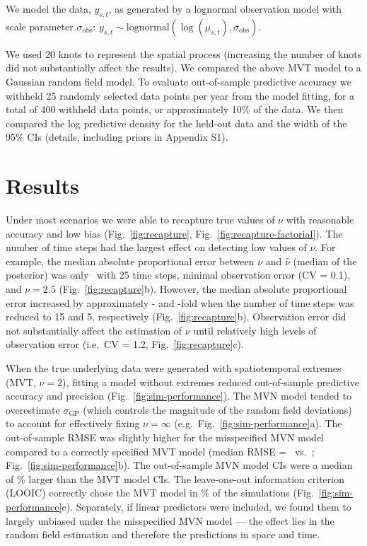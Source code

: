 \documentclass[12pt,english]{article}
\newcommand{\R}[1]{\label{#1}\linelabel{#1}}
\begin{document}
\begin{spacing}{1.8}
\noindent We model the data, $y_{s,t}$, as generated by a lognormal
observation model with scale parameter $\sigma_{\mathrm{obs}}$: $y_{s,t} \sim
\mathrm{lognormal} \left(  \log(\mu_{s,t}), \sigma_{\mathrm{obs}} \right)$.

We used 20 knots to represent the spatial process
(increasing the number of knots did not substantially affect the results). We
compared the above MVT model to a Gaussian random field model. To evaluate
out-of-sample predictive accuracy we withheld 25 randomly selected data points
per year from the model fitting, for a total of 400 withheld data points, or
approximately 10\% of the data. We then compared the log predictive density for
the held-out data and the width of the 95\% CIs
(details, including priors in Appendix S1).

\section{Results}

Under most scenarios we were able to recapture true values of $\nu$ with
reasonable accuracy and low bias (Fig.~\ref{fig:recapture},
Fig.~\ref{fig:recapture-factorial}). The number of time steps had the largest
effect on detecting low values of $\nu$. For example, the median absolute
proportional error between $\nu$ and $\hat{\nu}$ (median of the posterior) was
only \mapeTwentyFive\ with 25 time steps, minimal observation error (CV = 0.1),
and $\nu = 2.5$ (Fig.~\ref{fig:recapture}b). However, the median absolute
proportional error increased by approximately \mapeFifteenIncFold - and
\mapeFiveIncFold -fold when the number of time steps was reduced to 15 and 5,
respectively (Fig.~\ref{fig:recapture}b). Observation error did not
substantially affect the estimation of $\nu$ until relatively high levels of
observation error (i.e.\ CV = 1.2, Fig.~\ref{fig:recapture}c).

When the true underlying data were generated with spatiotemporal extremes (MVT,
$\nu = 2$), fitting a model without extremes reduced out-of-sample predictive
accuracy and precision (Fig.~\ref{fig:sim-performance}). The MVN model tended to
overestimate $\sigma_{\mathrm{GP}}$ (which controls the magnitude of the random field
deviations) to account for effectively fixing $\nu = \infty$ (e.g.\
Fig.~\ref{fig:sim-performance}a).
The out-of-sample RMSE was slightly higher for the
misspecified MVN model compared to a correctly specified MVT model (median RMSE
= \rmseWrong\ vs.\ \rmseRight; Fig.~\ref{fig:sim-performance}b). The out-of-sample MVN
model CIs were a median of \medianMedianCIWiderSim \% larger than the MVT model
CIs. The leave-one-out information criterion (LOOIC) correctly chose the MVT
model in \looCorrectSim \% of the simulations (Fig.~\ref{fig:sim-performance}c).
Separately, if linear predictors were included, we found them to largely
unbiased under the misspecified MVN model --- the effect lies in the random
field estimation and therefore the predictions in space and time.\R{B1}


\end{spacing}
\end{document}
